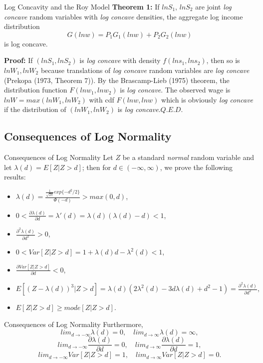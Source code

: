 \documentclass{beamer}
\begin{document}
\begin{frame}{Log Concavity and the Roy Model}
\textbf{Theorem 1:} If $lnS_1$, $lnS_2$ are joint \textit{log concave} random variables with \textit{log concave} densities, the aggregate log income distribution
	$$ G(lnw)=P_1G_1(lnw)+P_2G_2(lnw) $$
is log concave.

\bigskip
\textbf{Proof:} If $(lnS_1,lnS_2)$ is \textit{log concave} with density $f(lns_1,lns_2)$, then so is $lnW_1,lnW_2$ because translations of \textit{log concave} random variables are \textit{log concave} (Prekopa (1973, Theorem 7)). By the Brascamp-Lieb (1975) theorem, the distribution function $F(lnw_1,lnw_2)$ is \textit{log concave}. The observed wage is $lnW=max(lnW_1,lnW_2)$ with cdf $F(lnw,lnw)$ which is obviously \textit{log concave} if the distribution of $(lnW_1,lnW_2)$ is \textit{log concave}.\hfill $Q.E.D.$
\end{frame}
\subsection{Consequences of Log Normality}

\begin{frame}{Consequences of Log Normality}
Let $Z$ be a standard \textit{normal} random variable and let $\lambda(d)=E[Z|Z>d]$; then for $d\in (-\infty,\infty)$, we prove the following results:
\begin{itemize}
	\item $\lambda(d)=\frac{\frac{1}{\sqrt {2\pi}} exp\{-d^2/2\}}{\Phi(-d)}>max(0,d)$,
	\item $0<\frac{\partial \lambda(d)}{\partial d}=\lambda'(d)=\lambda(d)(\lambda(d)-d)<1$,
	\item $\frac {\partial^2\lambda(d)}{\partial d^2} > 0$,
	\item $0<Var[Z|Z>d]=1+\lambda(d)d-\lambda^2(d)<1$,
	\item $\frac{\partial Var[Z|Z>d]}{\partial d}<0 $,
	\item $E[(Z-\lambda(d))^3|Z>d]=\lambda(d)(2\lambda^2(d)-3d\lambda(d)+d^2-1)=\frac {\partial^2\lambda(d)}{\partial d^2},$
	\item $E[Z|Z>d]\geq mode[Z|Z>d]$.
\end{itemize}
\end{frame}
\begin{frame}{Consequences of Log Normality}
Furthermore,
$$lim_{d\to-\infty} \lambda(d)=0, \quad lim_{d\to\infty} \lambda(d)=\infty,$$
$$lim_{d\to-\infty} \frac{\partial\lambda(d)}{\partial d} =0, \quad lim_{d\to\infty} \frac{\partial\lambda(d)}{\partial d} =1,$$
$$lim_{d\to-\infty}Var[Z|Z>d]=1,\quad lim_{d\to\infty}Var[Z|Z>d]=0.$$
\end{frame}
\end{document}
